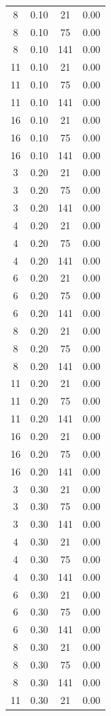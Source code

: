 \documentclass[10pt,a4paper]{article}
\begin{document}
\begin{center}
\begin{longtable}{cccc}
8  & 0.10 & 21  & 0.00 \\
8  & 0.10 & 75  & 0.00 \\
8  & 0.10 & 141 & 0.00 \\
11 & 0.10 & 21  & 0.00 \\
11 & 0.10 & 75  & 0.00 \\
11 & 0.10 & 141 & 0.00 \\
16 & 0.10 & 21  & 0.00 \\
16 & 0.10 & 75  & 0.00 \\
16 & 0.10 & 141 & 0.00 \\
3  & 0.20 & 21  & 0.00 \\
3  & 0.20 & 75  & 0.00 \\
3  & 0.20 & 141 & 0.00 \\
4  & 0.20 & 21  & 0.00 \\
4  & 0.20 & 75  & 0.00 \\
4  & 0.20 & 141 & 0.00 \\
6  & 0.20 & 21  & 0.00 \\
6  & 0.20 & 75  & 0.00 \\
6  & 0.20 & 141 & 0.00 \\
8  & 0.20 & 21  & 0.00 \\
8  & 0.20 & 75  & 0.00 \\
8  & 0.20 & 141 & 0.00 \\
11 & 0.20 & 21  & 0.00 \\
11 & 0.20 & 75  & 0.00 \\
11 & 0.20 & 141 & 0.00 \\
16 & 0.20 & 21  & 0.00 \\
16 & 0.20 & 75  & 0.00 \\
16 & 0.20 & 141 & 0.00 \\
3  & 0.30 & 21  & 0.00 \\
3  & 0.30 & 75  & 0.00 \\
3  & 0.30 & 141 & 0.00 \\
4  & 0.30 & 21  & 0.00 \\
4  & 0.30 & 75  & 0.00 \\
4  & 0.30 & 141 & 0.00 \\
6  & 0.30 & 21  & 0.00 \\
6  & 0.30 & 75  & 0.00 \\
6  & 0.30 & 141 & 0.00 \\
8  & 0.30 & 21  & 0.00 \\
8  & 0.30 & 75  & 0.00 \\
8  & 0.30 & 141 & 0.00 \\
11 & 0.30 & 21  & 0.00 \\

\end{longtable}
\end{center}
\end{document}
